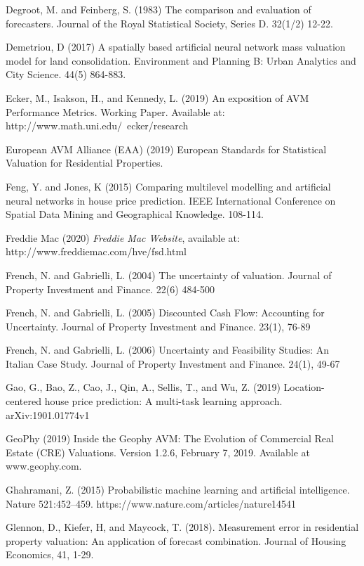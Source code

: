 \documentclass[colTwo]{anon}
\theoremstyle{definition}
\begin{document}
\begin{thebibliography}{50}
\harvarditem{}{}{}Degroot, M. and Feinberg, S. (1983) The comparison and evaluation of forecasters. Journal of the Royal Statistical Society, Series D. 32(1/2) 12-22.

\harvarditem{}{}{}Demetriou, D (2017) A spatially based artificial neural network mass valuation model for land consolidation. Environment and Planning B: Urban Analytics and City Science. 44(5) 864-883. 

\harvarditem{}{}{}Ecker, M., Isakson, H., and Kennedy, L. (2019) An exposition of AVM Performance Metrics.  Working Paper.  Available at: http://www.math.uni.edu/~ecker/research

\harvarditem{}{}{}European AVM Alliance (EAA) (2019) European Standards for Statistical Valuation for Residential Properties. 

\harvarditem{}{}{}Feng, Y. and Jones, K (2015) Comparing multilevel modelling and artificial neural networks in house price prediction. IEEE International Conference on Spatial Data Mining and Geographical Knowledge. 108-114.

\harvarditem{}{}{}Freddie Mac (2020) \textit{Freddie Mac Website}, available at: http://www.freddiemac.com/hve/fsd.html

\harvarditem{}{}{}French, N. and Gabrielli, L. (2004) The uncertainty of valuation.  Journal of Property Investment and Finance. 22(6) 484-500

\harvarditem{}{}{}French, N. and Gabrielli, L. (2005) Discounted Cash Flow: Accounting for Uncertainty.  Journal of Property Investment and Finance. 23(1), 76-89

\harvarditem{}{}{}French, N. and Gabrielli, L. (2006) Uncertainty and Feasibility Studies: An Italian Case Study.  Journal of Property Investment and Finance. 24(1), 49-67

\harvarditem{}{}{}Gao, G., Bao, Z., Cao, J., Qin, A., Sellis, T., and Wu, Z. (2019) Location-centered house price prediction: A multi-task learning approach. arXiv:1901.01774v1

\harvarditem{}{}{}GeoPhy (2019) Inside the Geophy AVM: The Evolution of Commercial Real Estate (CRE) Valuations. Version 1.2.6, February 7, 2019.  Available at www.geophy.com. 

\harvarditem{}{}{}Ghahramani, Z. (2015) Probabilistic machine learning and artificial intelligence. Nature 521:452–459. https://www.nature.com/articles/nature14541

\harvarditem{}{}{}Glennon, D., Kiefer, H, and Maycock, T. (2018). Measurement error in residential property valuation: An application of forecast combination. Journal of Housing Economics, 41, 1-29. 


\end{thebibliography}
\end{document}
